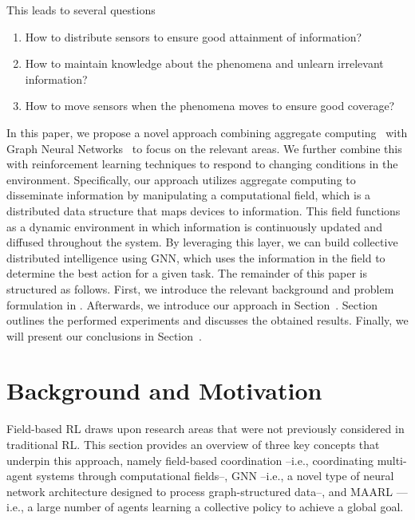 \documentclass[conference]{IEEEtran}
\begin{document}
This leads to several questions 
\begin{enumerate}
	\item How to distribute sensors to ensure good attainment of information?
	\item How to maintain knowledge about the phenomena and unlearn irrelevant information?
	\item How to move sensors when the phenomena moves to ensure good coverage?
\end{enumerate} 

In this paper, we propose a novel approach combining aggregate computing~\cite{Beal2015Computer} with Graph Neural Networks~\cite{Zhou2020AIOpen} to focus on the relevant areas. We further combine this with reinforcement learning techniques to respond to changing conditions in the environment.
Specifically, 
 our approach utilizes aggregate computing to disseminate information by manipulating a computational field, 
 which is a distributed data structure that maps devices to information. 
 This field functions as a dynamic environment in which information is continuously updated and diffused throughout the system. 
 By leveraging this layer, we can build collective distributed intelligence using \ac{GNN},
  which uses the information in the field to determine the best action for a given task.
The remainder of this paper is structured as follows. First, we introduce the relevant background and problem formulation in . Afterwards, we introduce our approach in Section~. Section~ outlines the performed experiments and discusses the obtained results. Finally, we will present our conclusions in Section~.


\section{Background and Motivation}
Field-based RL draws upon research areas that were not previously considered in traditional RL. 
%
This section provides an overview of three key concepts that underpin this approach, 
 namely 
 field-based coordination --i.e., coordinating multi-agent systems through computational fields--, 
 \ac{GNN} --i.e., a novel type of neural network architecture designed to process graph-structured data--, 
 and \ac{MAARL} ---i.e., a large number of agents learning a collective policy to achieve a global goal.
\label{sec:background}
\end{document}
